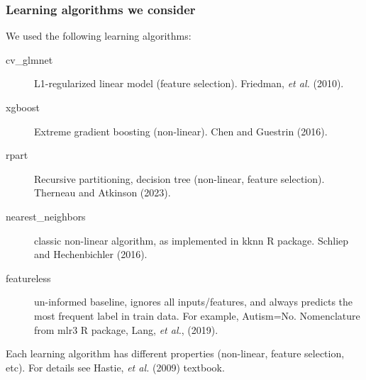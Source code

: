 \documentclass[t]{beamer}
\begin{document}
\begin{frame}
  \frametitle{Learning algorithms we consider}
  We used the following learning algorithms:
\begin{description}
\item[cv\_glmnet] L1-regularized linear model (feature
  selection). Friedman, \emph{et al.} (2010).
\item[xgboost] Extreme gradient boosting (non-linear). Chen and Guestrin (2016). 
\item[rpart] Recursive partitioning, decision tree (non-linear, feature selection). Therneau and Atkinson (2023).
\item[nearest\_neighbors] classic non-linear algorithm, as implemented
  in kknn R package. Schliep and Hechenbichler (2016).
\item[featureless] un-informed baseline, ignores all inputs/features,
  and always predicts the most frequent label in train data. For
  example, Autism=No. Nomenclature from mlr3 R package,
  Lang, \emph{et al.}, (2019).
\end{description}
Each learning algorithm has different properties (non-linear, feature
selection, etc). For details see Hastie, {\it et al.} (2009) textbook.
\end{frame}
\end{document}
